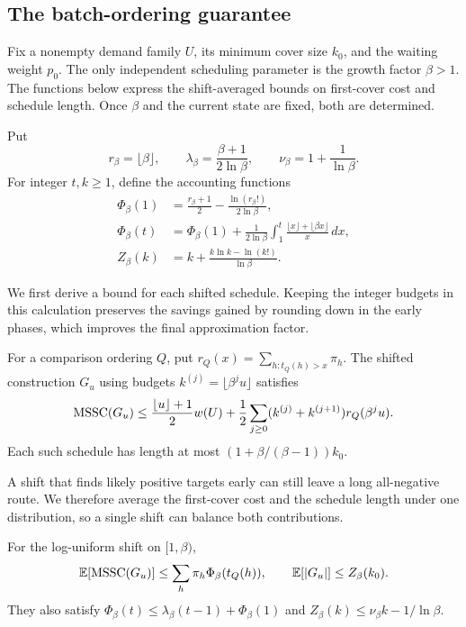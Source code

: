 \subsection{The batch-ordering guarantee}

Fix a nonempty demand family $U$, its minimum cover size $k_0$, and
the waiting weight $p_0$. The only independent scheduling parameter
is the growth factor $\beta>1$. The functions below express the
shift-averaged bounds on first-cover cost and schedule length. Once
$\beta$ and the current state are fixed, both are determined.

Put
\[
 r_\beta=\lfloor\beta\rfloor,\qquad
 \lambda_\beta=\frac{\beta+1}{2\ln\beta},\qquad
 \nu_\beta=1+\frac1{\ln\beta}.
\]
For integer $t,k\ge1$, define the accounting functions
\[
 \begin{aligned}
 \Phi_\beta(1)&=\frac{r_\beta+1}{2}
                 -\frac{\ln(r_\beta!)}{2\ln\beta},\\
 \Phi_\beta(t)
 &=\Phi_\beta(1)
    +\frac1{2\ln\beta}\int_1^t
       \frac{\lfloor x\rfloor+\lfloor\beta x\rfloor}{x}\,dx,\\
 Z_\beta(k)
 &=k+\frac{k\ln k-\ln(k!)}{\ln\beta}.
 \end{aligned}
\]

We first derive a bound for each shifted schedule. Keeping the integer
budgets in this calculation preserves the savings gained by rounding
down in the early phases, which improves the final approximation factor.

\begin{proposition}
\label{prop:batch-invoice}
For a comparison ordering $Q$, put
$r_Q(x)=\sum_{h:t_Q(h)>x}\pi_h$. The shifted construction $G_u$
using budgets $k^{(j)}=\lfloor\beta^ju\rfloor$ satisfies
\[
\operatorname{MSSC}(G_u)\le\frac{\lfloor u\rfloor+1}{2}w(U)
 +\frac12\sum_{j\ge0}(k^{(j)}+k^{(j+1)})r_Q(\beta^ju).
\]
Each such schedule has length at most
$(1+\beta/(\beta-1))k_0$.
\end{proposition}

A shift that finds likely positive targets early can still leave a long
all-negative route. We therefore average the first-cover cost and the
schedule length under one distribution, so a single shift can balance
both contributions.

\begin{proposition}
\label{prop:batch-average}
For the log-uniform shift on $[1,\beta)$,
\[
\mathbb E[\operatorname{MSSC}(G_u)]\le\sum_h\pi_h\Phi_\beta(t_Q(h)),
\qquad \mathbb E[|G_u|]\le Z_\beta(k_0).
\]
They also satisfy $\Phi_\beta(t)\le\lambda_\beta(t-1)+\Phi_\beta(1)$
and $Z_\beta(k)\le\nu_\beta k-1/\ln\beta$.
\end{proposition}

